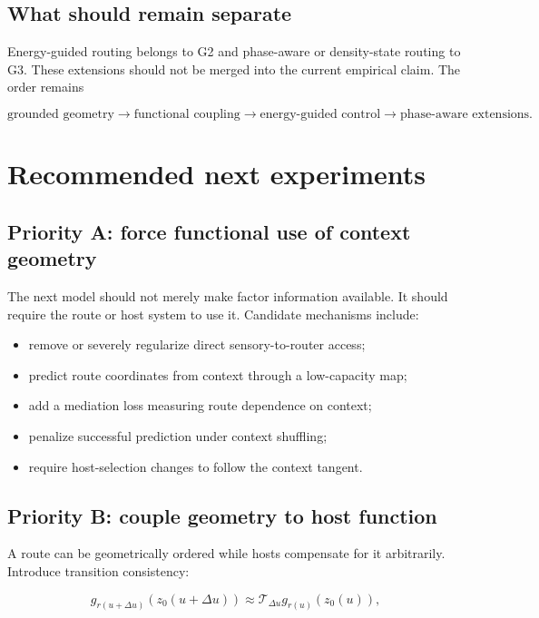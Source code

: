 \documentclass[11pt,a4paper]{article}
\begin{document}
\subsection{What should remain separate}

Energy-guided routing belongs to G2 and phase-aware or density-state routing to G3. These extensions should not be merged into the current empirical claim. The order remains

\begin{equation}
 \text{grounded geometry}\rightarrow
 \text{functional coupling}\rightarrow
 \text{energy-guided control}\rightarrow
 \text{phase-aware extensions}.
\end{equation}

\section{Recommended next experiments}

\subsection{Priority A: force functional use of context geometry}

The next model should not merely make factor information available. It should require the route or host system to use it. Candidate mechanisms include:

\begin{itemize}
\item remove or severely regularize direct sensory-to-router access;
\item predict route coordinates from context through a low-capacity map;
\item add a mediation loss measuring route dependence on context;
\item penalize successful prediction under context shuffling;
\item require host-selection changes to follow the context tangent.
\end{itemize}

\subsection{Priority B: couple geometry to host function}

A route can be geometrically ordered while hosts compensate for it arbitrarily. Introduce transition consistency:

\begin{equation}
 g_{r(u+\Delta u)}(z_0(u+\Delta u))
 \approx \mathcal{T}_{\Delta u}
 g_{r(u)}(z_0(u)),
\end{equation}
\end{document}
